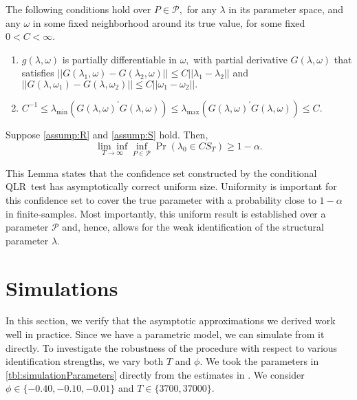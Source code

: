\documentclass[11pt, letterpaper, twoside]{article}
\begin{document}
\begin{assumpS}
    \label{assump:S}
The following conditions hold over $P\in \mathcal{P},$ for any $\lambda $ in its parameter space, and any $\omega $ in some fixed neighborhood around its true value, for some fixed $0<C<\infty$.
%
\begin{enumerate}
    \item $g(\lambda ,\omega )$ is partially differentiable in $\omega ,$ with partial derivative $G(\lambda ,\omega )$ that satisfies $||G(\lambda _{1},\omega )-G(\lambda _{2},\omega )||\leq C||\lambda _{1}-\lambda _{2}||$ and $||G(\lambda ,\omega _{1})-G(\lambda ,\omega _{2})||\leq C||\omega _{1}-\omega _{2}||.$
%
    \item $C^{-1}\leq \lambda _{\min }(G(\lambda ,\omega )^{\prime }G(\lambda ,\omega ))\leq \lambda _{\max }(G(\lambda ,\omega )^{\prime }G(\lambda ,\omega ))\leq C$.
\end{enumerate}
\end{assumpS}

\begin{theorem}
    \label{Lemma CS}
    Suppose \cref{assump:R} and \cref{assump:S} hold. Then, 
%
    \begin{equation*} 
        \underset{T\rightarrow \infty }{\lim \inf }\underset{P\in \mathcal{P}}{\inf }\Pr \left( \lambda _{0}\in CS_{T}\right) \geq 1-\alpha .
    \end{equation*}
\end{theorem}

This Lemma states that the confidence set constructed by the conditional QLR\ test has asymptotically correct uniform size. Uniformity is important for this confidence set to cover the true parameter with a probability close to $1-\alpha $ in finite-samples. Most importantly, this uniform result is established over a parameter $\mathcal{P}$ and, hence,  allows for the weak identification of the structural parameter $\lambda$.

\section{Simulations}\label{sec:simulation}

In this section, we verify that the asymptotic approximations we derived work well in practice.  Since we have a parametric model, we can simulate from it directly.  To investigate the robustness of the procedure with respect to various identification strengths, we vary both $T$ and $\phi$.  We took the parameters in \cref{tbl:simulationParameters} directly from the estimates in \textcite{han2018leverage}.  We consider $\phi \in \lbrace -0.40, -0.10, -0.01 \rbrace$ and $T \in \lbrace 3700, 37000 \rbrace$. 
\end{document}
